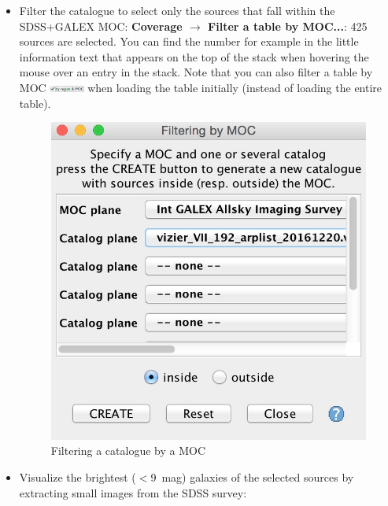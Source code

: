 \documentclass [a4paper, 12pt]{article}
\begin{document}
\begin{itemize}
    \item Filter the catalogue to select only the sources that fall within
the SDSS+GALEX MOC: \textbf{Coverage $\rightarrow$ Filter a table by
MOC...}: 425 sources are selected. You can find the number for example in the
little information text that appears on the top of the stack when hovering the
mouse over an entry in the stack. Note that you can also filter a table by MOC
\includegraphics[width=0.09\textwidth]{../images/aladin_load_byMOC.png}
when loading the table initially (instead of loading the entire table).
\begin{figure}[H]
\center
\includegraphics[width=0.4
\textwidth]{../images/aladin_moc_filter-tab-by-moc.jpg}
\caption{Filtering a catalogue by a MOC}
\label{fig:filtermoc}
\end{figure}

    \item Visualize the brightest ($<$9~mag) galaxies of the selected
sources by extracting small images from the SDSS survey:


\end{itemize}
\end{document}
